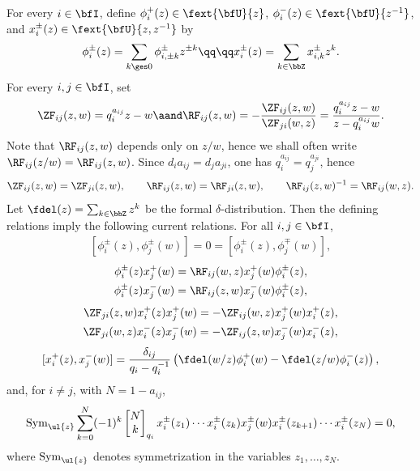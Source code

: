 \documentclass[reqno]{amsart}
\numberwithin{equation}{section}
\begin{document}
For every $i\in\bfI$, define $\phi^{+}_i(z)\in\fext{\bfU}{z}$, $\phi^{-}_i(z)\in\fext{\bfU}{z^{-1}}$, and $x^{\pm}_i(z)\in\fext{\bfU}{z,z^{-1}}$ by
\[
\phi_{i}^{\pm}(z) = \sum_{k \ges 0} \phi_{i, \pm k}^{\pm} z^{\pm k}
\qq\qq 
x_{i}^{\pm}(z) = \sum_{k \in \bbZ} x_{i,k}^{\pm} z^{k}. 
\]
For every $i,j\in\bfI$, set
\[
\ZF_{ij}(z,w)=q_i^{a_{ij}}z-w
\aand 
\RF_{ij}(z,w)
=
-\frac{\ZF_{ij}(z,w)}{\ZF_{ji}(w,z)}
=
\frac{q_i^{a_{ij}}z-w}{z-q_i^{a_{ij}}w}.
\]
Note that $\RF_{ij}(z,w)$ depends only on $z/w$, hence we shall often write $\RF_{ij}(z/w)=\RF_{ij}(z,w)$. Since $d_ia_{ij}=d_ja_{ji}$, one has $q_i^{a_{ij}}=q_j^{a_{ji}}$, hence
\[
\ZF_{ij}(z,w)=\ZF_{ji}(z,w),
\qquad
\RF_{ij}(z,w)=\RF_{ji}(z,w),
\qquad
\RF_{ij}(z,w)^{-1}=\RF_{ij}(w,z).
\]
Let $\fdel(z)=\sum_{k\in\bbZ}z^k$
be the formal $\delta$-distribution. Then the defining relations imply the following current relations. For all $i,j\in\bfI$,
\begin{align}
	\label{eq:commutative-rel-field}
	[\phi^{\pm}_i(z),\phi^{\pm}_j(w)]=0=[\phi^{\pm}_i(z),\phi^{\mp}_j(w)],
\end{align}
\begin{align}
	\label{eq:weight-rel-fields-plus}
	\phi^\pm_i(z)x^{+}_j(w)=\RF_{ij}(w,z)x^{+}_j(w)\phi^{\pm}_i(z),\\
	\label{eq:weight-rel-fields-minus}
	\phi^\pm_i(z)x^{-}_j(w)=\RF_{ij}(z,w)x^{-}_j(w)\phi^{\pm}_i(z),
\end{align}
\begin{align}
	\label{eq:quadratic-rel-fields-plus}
	\ZF_{ji}(z,w)x^{+}_i(z)x^{+}_j(w)=-\ZF_{ij}(w,z)x^{+}_j(w)x^{+}_i(z),\\
	\label{eq:quadratic-rel-fields-minus}
	\ZF_{ji}(w,z)x^{-}_i(z)x^{-}_j(w)=-\ZF_{ij}(z,w)x^{-}_j(w)x^{-}_i(z),
\end{align}
\begin{align}
	\label{eq:double}
	[x^+_i(z),x^-_j(w)]
	=
	\frac{\delta_{ij}}{q_i-q_i^{-1}}
	\left(
	\fdel(w/z)\phi^+_i(w)
	-
	\fdel(z/w)\phi^-_i(z)
	\right),
\end{align}
and, for $i\neq j$, with $N=1-a_{ij}$,
\begin{align}\label{eq:serre-relations}
	\operatorname{Sym}_{\ul{z}}
	\sum_{k=0}^{N}
	(-1)^k
	\begin{bmatrix}N\\ k\end{bmatrix}_{q_i}
	x^{\pm}_i(z_1)\cdots x^{\pm}_i(z_k)x^{\pm}_j(w)
	x^{\pm}_i(z_{k+1})\cdots x^{\pm}_i(z_N)
	=0,
\end{align}
where $\operatorname{Sym}_{\ul{z}}$ denotes symmetrization in the variables $z_1,\dots,z_N$.\\ 
\end{document}
